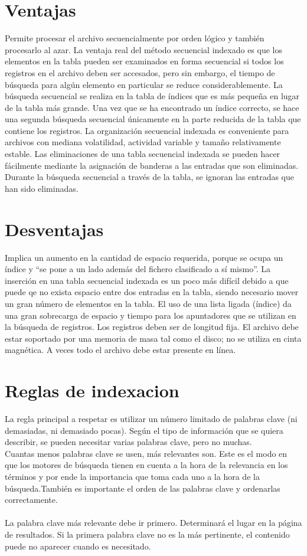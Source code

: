 \documentclass[11pt,a4paper]{article}
\begin{document}
\section*{Ventajas}
Permite procesar el archivo secuencialmente por orden lógico y también procesarlo al azar.
La ventaja real del método secuencial indexado es que los elementos en la tabla pueden ser examinados en forma secuencial si todos los registros en el archivo deben ser accesados, pero sin embargo, el tiempo de búsqueda para algún elemento en particular se reduce considerablemente. La búsqueda secuencial se realiza en la tabla de índices que es más pequeña en lugar de la tabla más grande. Una vez que se ha encontrado un índice correcto, se hace una segunda búsqueda secuencial únicamente en la parte reducida de la tabla que contiene los registros.
La organización secuencial indexada es conveniente para archivos con mediana volatilidad, actividad variable y tamaño relativamente estable.
Las eliminaciones de una tabla secuencial indexada se pueden hacer fácilmente mediante la asignación de banderas a las entradas que son eliminadas. Durante la búsqueda secuencial a través de la tabla, se ignoran las entradas que han sido eliminadas.

\section*{Desventajas}
Implica un aumento en la cantidad de espacio requerida, porque se ocupa un índice y “se pone a un lado además del fichero clasificado a sí mismo”.
La inserción en una tabla secuencial indexada es un poco más difícil debido a que puede qe no exista espacio entre dos entradas en la tabla, siendo necesario mover un gran número de elementos en la tabla.
El uso de una lista ligada (índice) da una gran sobrecarga de espacio y tiempo para los apuntadores que se utilizan en la búsqueda de registros.
Los registros deben ser de longitud fija. El archivo debe estar soportado por una memoria de masa tal como el disco; no se utiliza en cinta magnética. A veces todo el archivo debe estar presente en línea.

\section{Reglas de indexacion}
La regla principal a respetar es utilizar un número limitado de palabras clave (ni demasiadas, ni demasiado pocas). Según el tipo de información que se quiera describir, se  pueden necesitar varias palabras clave, pero no muchas.
\\
Cuantas menos palabras clave se usen, más relevantes son. Este es el modo en que los motores de búsqueda tienen en cuenta a la hora de la relevancia en los términos y por ende la importancia que toma cada uno a la hora de la búsqueda.También es importante el orden de las palabras clave y ordenarlas correctamente.
\\\\
La palabra clave más relevante debe ir primero. Determinará el lugar en la página de resultados. Si la primera palabra clave no es la más pertinente, el contenido puede no aparecer cuando es necesitado.
\end{document}
